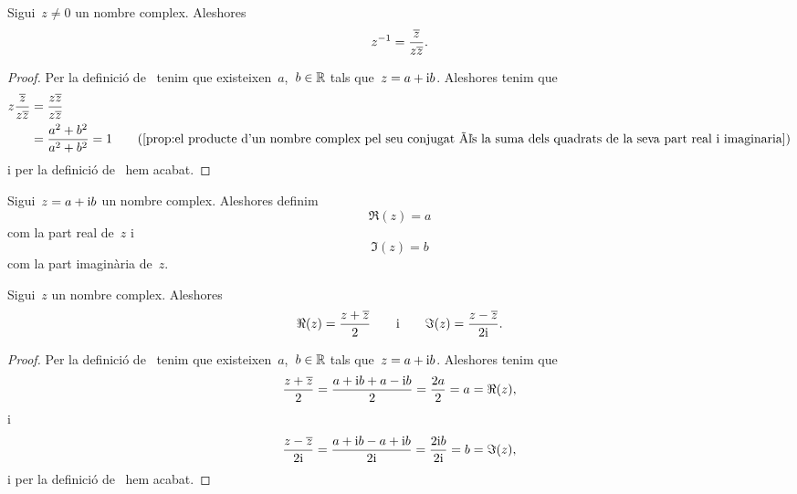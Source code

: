 \documentclass[../Apunts.tex]{subfiles}
\begin{document}
	\begin{proposition}
		\label{prop:inversa d'un nombre complex en funció del seu conjugat}
		Sigui~\(z\neq0\) un nombre complex. Aleshores
		\[z^{-1}=\frac{\overline{z}}{z\overline{z}}.\]
	\end{proposition}
	\begin{proof}
		Per la definició de~ tenim que existeixen~\(a\),~\(b\in\mathbb{R}\) tals que~\(z=a+\mathrm{i} b\). Aleshores tenim que
		\begin{align*}
			z\frac{\conjugat{z}}{z\conjugat{z}}&=\frac{z\conjugat{z}}{z\conjugat{z}} \\
			&=\frac{a^{2}+b^{2}}{a^{2}+b^{2}}=1 \tag{\ref{prop:el producte d'un nombre complex pel seu conjugat és la suma dels quadrats de la seva part real i imaginaria}}
		\end{align*}
		i per la definició de~ hem acabat.
	\end{proof}
	\begin{definition}
		\label{def:part real i part imaginària d'un nombre complex}
		\label{def:part real d'un nombre complex}
		\label{def:part imaginària d'un nombre complex}
		Sigui~\(z=a+\mathrm{i} b\) un nombre complex. Aleshores definim
		\[\Re(z)=a\]
		com la part real de~\(z\) i
		\[\Im(z)=b\]
		com la part imaginària de~\(z\).
	\end{definition}
	\begin{proposition}
		\label{prop:fórmules per la part real i part imaginària d'un nombre complex}
		\label{prop:fórmula per la part real d'un nombre complex}
		\label{prop:fórmula per la part imaginària d'un nombre complex}
		Sigui~\(z\) un nombre complex. Aleshores
		\[\Re(z)=\frac{z+\overline{z}}{2}\qquad\text{i}\qquad\Im(z)=\frac{z-\overline{z}}{2\mathrm{i}}.\]
	\end{proposition}
	\begin{proof}
		Per la definició de~ tenim que existeixen~\(a\),~\(b\in\mathbb{R}\) tals que~\(z=a+\mathrm{i} b\). Aleshores tenim que
		\[\frac{z+\overline{z}}{2}=\frac{a+\mathrm{i} b+a-\mathrm{i} b}{2}=\frac{2a}{2}=a=\Re(z),\]
		i
		\[\frac{z-\overline{z}}{2\mathrm{i}}=\frac{a+\mathrm{i} b-a+\mathrm{i} b}{2\mathrm{i}}=\frac{2\mathrm{i} b}{2\mathrm{i}}=b=\Im(z),\]
		i per la definició de~ hem acabat.
	\end{proof}
\end{document}
